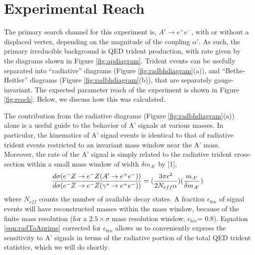 \section{Experimental Reach}

The primary search channel for this experiment is, $A' \rightarrow e^+ e^-$, with or without
 a displaced vertex, depending on the magnitude of the coupling $\alpha'$. As such, 
the primary irreducible 
background is QED trident production, with rate given by the diagrams shown in 
Figure \ref{fig:apdiagram}. Trident events can be usefully separated into ``radiative'' diagrams 
(Figure \ref{fig:radbhdiagram}(a)), and ``Bethe-Heitler'' diagrams (Figure \ref{fig:radbhdiagram}(b)), that are separately 
gauge-invariant.  The expected parameter reach of the experiment is shown in Figure \ref{fig:reach}.  Below, we discuss how this was calculated.  

The contribution from the radiative diagrams (Figure \ref{fig:radbhdiagram}(a)) alone is a useful guide 
to the behavior of A' signals at various masses.  In particular, the kinematics of A' 
signal events is identical to that of radiative trident events restricted to an invariant 
mass window near the A' mass.  Moreover, the rate of the A' signal is simply related to 
the radiative trident cross-section within a small mass window of width $\delta m_{A'}$  
by [1],
\begin{equation}
 {{d\sigma(e^-Z\rightarrow e^-Z(A'\rightarrow e^+e^-))} \over
    {d\sigma(e^-Z\rightarrow e^-Z(\gamma^*\rightarrow e^+e^-))}} =
    ({{3\pi \epsilon^2} \over {2N_{eff}\alpha}}) ({{m_{A'}} \over {\delta m_{A'}}})
  \label{eqn:radToAprime}
\end{equation}
where $N_{eff}$ counts the number of available decay states.  A fraction $\epsilon_{bin}$ 
of signal events will have reconstructed masses within the mass window, because of the 
finite mass resolution  (for a $2.5 \times \sigma$ mass resolution window, 
$\epsilon_{bin}$= 0.8).  Equation \ref{eqn:radToAprime} corrected for $\epsilon_{bin}$ allows us to 
conveniently express the sensitivity to A' signals in terms of the radiative portion 
of the total QED trident statistics, which we will do shortly. 

